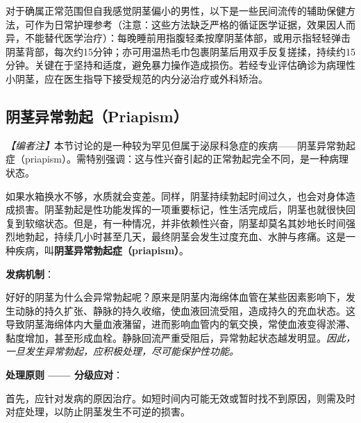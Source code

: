 \begin{tcolorbox}[colback=pink!5!white,colframe=red!50!black,title=贴心小叮咛]
对于确属正常范围但自我感觉阴茎偏小的男性，以下是一些民间流传的辅助保健方法，可作为日常护理参考（注意：这些方法缺乏严格的循证医学证据，效果因人而异，不能替代医学治疗）：每晚睡前用指腹轻柔按摩阴茎体部，或用示指轻轻弹击阴茎背部，每次约15分钟；亦可用温热毛巾包裹阴茎后用双手反复搓揉，持续约15分钟。关键在于坚持和适度，避免暴力操作造成损伤。若经专业评估确诊为病理性小阴茎，应在医生指导下接受规范的内分泌治疗或外科矫治。
\end{tcolorbox}

\subsection{阴茎异常勃起（Priapism）}

\noindent\textit{【编者注】}本节讨论的是一种较为罕见但属于泌尿科急症的疾病——阴茎异常勃起症（priapism）。需特别强调：这与性兴奋引起的正常勃起完全不同，是一种病理状态。

\vspace{0.5em}
如果水箱换水不够，水质就会变差。同样，阴茎持续勃起时间过久，也会对身体造成损害。阴茎勃起是性功能发挥的一项重要标记，性生活完成后，阴茎也就很快回复到软缩状态。但是，有一种情况，并非依赖性兴奋，阴茎却莫名其妙地长时间强烈地勃起，持续几小时甚至几天，最终阴茎会发生过度充血、水肿与疼痛。这是一种疾病，叫\textbf{阴茎异常勃起症（priapism）}。

\vspace{0.5em}
\noindent\textbf{发病机制}：

好好的阴茎为什么会异常勃起呢？原来是阴茎内海绵体血管在某些因素影响下，发生动脉的持久扩张、静脉的持久收缩，使血液回流受阻，造成持久的充血状态。这导致阴茎海绵体内大量血液潴留，进而影响血管内的氧交换，常使血液变得淤滞、黏度增加，甚至形成血栓。静脉回流严重受阻后，异常勃起状态越发明显。\textit{因此，一旦发生异常勃起，应积极处理，尽可能保护性功能。}

\vspace{0.5em}
\noindent\textbf{处理原则 —— 分级应对}：

首先，应针对发病的原因治疗。如短时间内可能无效或暂时找不到原因，则需及时对症处理，以防止阴茎发生不可逆的损害。

